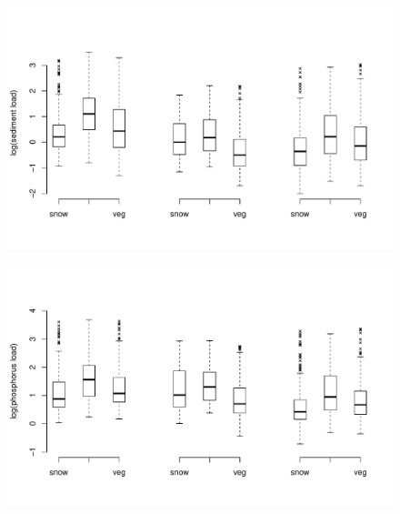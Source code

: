 \documentclass[12pt]{article}
\begin{document}
\begin{figure}[h]
    \begin{center}
\includegraphics{loadings-boxplot_stot}

    \end{center}
\end{figure}







\begin{figure}[h]
    \begin{center}
\includegraphics{loadings-boxplot_ptot}

    \end{center}
\end{figure}
\end{document}
